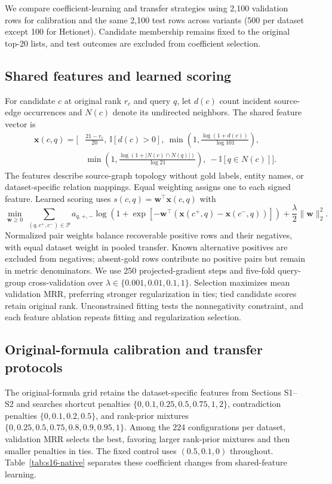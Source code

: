 \section{}
\label{sec:s12-calibration}
\begin{revisionblock}
We compare coefficient-learning and transfer strategies using 2,100 validation rows for calibration and the same 2,100 test rows across variants (500 per dataset except 100 for Hetionet). Candidate membership remains fixed to the original top-20 lists, and test outcomes are excluded from coefficient selection.

\subsection{Shared features and learned scoring}
For candidate $c$ at original rank $r_c$ and query $q$, let $d(c)$ count incident source-edge occurrences and $N(c)$ denote its undirected neighbors. The shared feature vector is
\[
\begin{aligned}
\mathbf{x}(c,q)=\bigg[&\frac{21-r_c}{20},\ \mathbb{I}[d(c)>0],\
\min\!\left(1,\frac{\log(1+d(c))}{\log101}\right),\\
&\min\!\left(1,\frac{\log(1+|N(c)\cap N(q)|)}{\log21}\right),\
-\mathbb{I}[q\in N(c)]\bigg].
\end{aligned}
\]
The features describe source-graph topology without gold labels, entity names, or dataset-specific relation mappings. Equal weighting assigns one to each signed feature. Learned scoring uses $s(c,q)=\mathbf{w}^{\top}\mathbf{x}(c,q)$ with
\[
\min_{\mathbf{w}\geq0}\ 
\sum_{(q,c^+,c^-)\in\mathcal{P}} a_{q,+,-}
\log\!\left(1+\exp[-\mathbf{w}^{\top}(\mathbf{x}(c^+,q)-\mathbf{x}(c^-,q))]\right)
+\frac{\lambda}{2}\|\mathbf{w}\|_2^2.
\]
Normalized pair weights balance recoverable positive rows and their negatives, with equal dataset weight in pooled transfer. Known alternative positives are excluded from negatives; absent-gold rows contribute no positive pairs but remain in metric denominators. We use 250 projected-gradient steps and five-fold query-group cross-validation over $\lambda\in\{0.001,0.01,0.1,1\}$. Selection maximizes mean validation MRR, preferring stronger regularization in ties; tied candidate scores retain original rank. Unconstrained fitting tests the nonnegativity constraint, and each feature ablation repeats fitting and regularization selection.

\subsection{Original-formula calibration and transfer protocols}
The original-formula grid retains the dataset-specific features from Sections S1--S2 and searches shortcut penalties $\{0,0.1,0.25,0.5,0.75,1,2\}$, contradiction penalties $\{0,0.1,0.2,0.5\}$, and rank-prior mixtures $\{0,0.25,0.5,0.75,0.8,0.9,0.95,1\}$. Among the 224 configurations per dataset, validation MRR selects the best, favoring larger rank-prior mixtures and then smaller penalties in ties. The fixed control uses $(0.5,0.1,0)$ throughout. Table~\ref{tab:s16-native} separates these coefficient changes from shared-feature learning.


\end{revisionblock}
